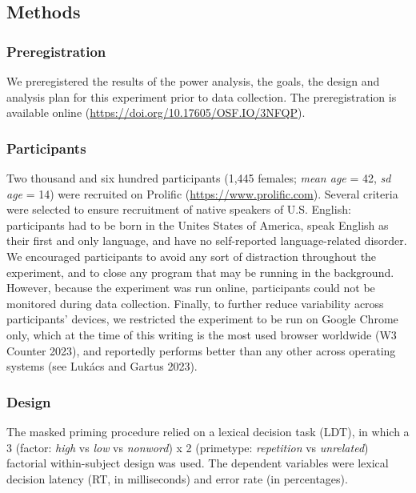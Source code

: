 \documentclass[
]{interact}
\begin{document}
\subsection{Methods}\label{sec-exp1-methods}

\subsubsection{Preregistration}\label{sec-exp1-prereg}

We preregistered the results of the power analysis, the goals, the
design and analysis plan for this experiment prior to data collection.
The preregistration is available online
(\url{https://doi.org/10.17605/OSF.IO/3NFQP}).

\subsubsection{Participants}\label{sec-exp1-methods-participants}

Two thousand and six hundred participants (1,445 females; \emph{mean
age} = 42, \emph{sd age} = 14) were recruited on Prolific
(\url{https://www.prolific.com}). Several criteria were selected to
ensure recruitment of native speakers of U.S. English: participants had
to be born in the Unites States of America, speak English as their first
and only language, and have no self-reported language-related disorder.
We encouraged participants to avoid any sort of distraction throughout
the experiment, and to close any program that may be running in the
background. However, because the experiment was run online, participants
could not be monitored during data collection. Finally, to further
reduce variability across participants' devices, we restricted the
experiment to be run on Google Chrome only, which at the time of this
writing is the most used browser worldwide (W3 Counter 2023), and
reportedly performs better than any other across operating systems (see
Lukács and Gartus 2023).

\subsubsection{Design}\label{sec-exp1-methods-design}

The masked priming procedure relied on a lexical decision task (LDT), in
which a 3 (factor: \emph{high} vs \emph{low} vs \emph{nonword}) x 2
(primetype: \emph{repetition} vs \emph{unrelated}) factorial
within-subject design was used. The dependent variables were lexical
decision latency (RT, in milliseconds) and error rate (in percentages).
\end{document}
